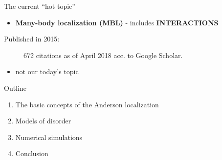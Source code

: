 \documentclass[1pt]{beamer}
\begin{document}
\begin{frame}{The current ``hot topic''}
\begin{itemize}
\item \textbf{Many-body localization (MBL)} - includes \textbf{INTERACTIONS}
\vspace{10mm}
\end{itemize}
\begin{minipage}[c]{0.6\textwidth}
Published in 2015:
\begin{figure}
\caption{672 citations as of April 2018 acc. to Google Scholar.}
\end{figure}
\end{minipage}
\begin{minipage}[c]{0.38\textwidth}
\begin{itemize}
\vspace{5mm}
\item not our today's topic
\end{itemize}
\end{minipage}
\end{frame}

\begin{frame}{Outline}

\begin{enumerate}
\item The basic concepts of the Anderson localization
\vspace{10mm}
\item Models of disorder
\vspace{10mm}
\item Numerical simulations
\vspace{10mm}
\item Conclusion
\end{enumerate}


\end{frame}
\end{document}
